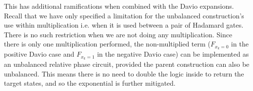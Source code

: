 This has additional ramifications when combined with the Davio expansions. Recall that we have only specified a limitation for
the unbalanced construction's use within multiplication i.e. when it is used between a pair of Hadamard gates. There is no such
restriction when we are not doing any multiplication. Since there is only one multiplication performed, the non-multiplied term
($F_{x_k=0}$ in the positive Davio case and $F_{x_k=1}$ in the negative Davio case) can be implemented as an unbalanced relative phase circuit,
provided the parent construction can also be unbalanced. This means there is no need to double the logic inside to return the target states,
and so the exponential is further mitigated. 





